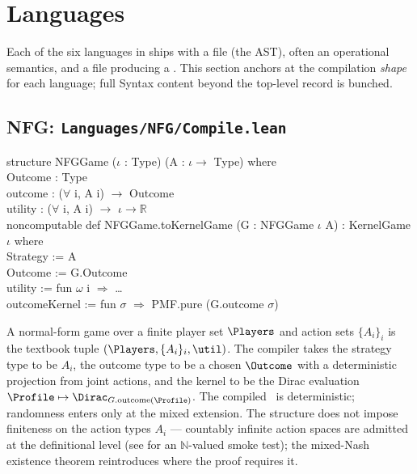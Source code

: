 \section{Languages}
\label{sec:supp:languages}

Each of the six languages in  ships with a
 file (the AST), often an  operational
semantics, and a  file producing a
.  This section anchors at the compilation
\emph{shape} for each language; full Syntax content beyond the
top-level record is bunched.

\subsection{NFG: \texttt{Languages/NFG/Compile.lean}}
\label{sec:supp:nfg}\label{def:NFG.NFGGame}\label{def:NFG.toKernelGame}

\begin{leanbox}
structure NFGGame ($\iota$ : Type) (A : $\iota \to$ Type) where\\
\bd Outcome  : Type\\
\bd outcome  : ($\forall$ i, A i) $\to$ Outcome\\
\bd utility  : ($\forall$ i, A i) $\to$ $\iota \to \mathbb{R}$\\[3pt]
noncomputable def NFGGame.toKernelGame (G : NFGGame $\iota$ A) : KernelGame $\iota$ where\\
\bd Strategy := A\\
\bd Outcome  := G.Outcome\\
\bd utility  := fun $\omega$ i $\Rightarrow$ \dots\\
\bd outcomeKernel := fun $\sigma$ $\Rightarrow$ PMF.pure (G.outcome $\sigma$)
\end{leanbox}

\Mathematical
A normal-form game over a finite player set $\Players$ and
action sets $\{A_i\}_i$ is the textbook tuple
$(\Players, \{A_i\}_i, \util)$.  The compiler takes the strategy
type to be $A_i$, the outcome type to be a chosen $\Outcome$ with
a deterministic projection from joint actions, and the kernel to
be the Dirac evaluation $\Profile \mapsto \Dirac_{G.\mathrm{outcome}(\Profile)}$.
The compiled \KG\ is deterministic; randomness enters only at the
mixed extension.  The structure does not impose finiteness on the
action types $A_i$ — countably infinite action spaces are
admitted at the definitional level (see
 for an $\mathbb{N}$-valued
smoke test); the mixed-Nash existence theorem reintroduces
\TT{[Fintype (A i)]} where the proof requires it.

